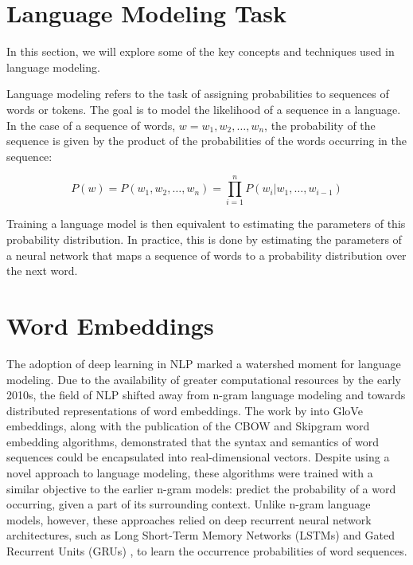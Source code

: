 
\section{Language Modeling Task}

In this section, we will explore some of the key concepts and techniques used in language modeling. 

Language modeling refers to the task of assigning probabilities to sequences of words or tokens. The goal is to model the likelihood of a sequence in a language. In the case of a sequence of words, $w = w_1, w_2, \ldots, w_n$, the probability of the sequence is given by the product of the probabilities of the words occurring in the sequence:

\begin{equation}    
    P(w) = P(w_1, w_2, \ldots, w_n) = \prod_{i=1}^n P(w_i | w_1, \ldots, w_{i-1})
\end{equation}

Training a language model is then equivalent to estimating the parameters of this probability distribution. In practice, this is done by estimating the parameters of a neural network that maps a sequence of words to a probability distribution over the next word. 


\section{Word Embeddings}

The adoption of deep learning in NLP marked a watershed moment for language modeling. Due to the availability of greater computational resources by the early 2010s, the field of NLP shifted away from n-gram language modeling and towards distributed representations of word embeddings. The work by \cite{pennington2014glove} into GloVe embeddings, along with the publication of the CBOW \citep{mikolov2013efficient} and Skipgram \citep{mikolov2013distributed, mikolov2013efficient} word embedding algorithms, demonstrated that the syntax and semantics of word sequences could be encapsulated into real-dimensional vectors. Despite using a novel approach to language modeling, these algorithms were trained with a similar objective to the earlier n-gram models: predict the probability of a word occurring, given a part of its surrounding context. Unlike n-gram language models, however, these approaches relied on deep recurrent neural network architectures, such as Long Short-Term Memory Networks (LSTMs) \citep{hochreiter1997long} and Gated Recurrent Units (GRUs) \citep{cho2014properties}, to learn the occurrence probabilities of word sequences. 


